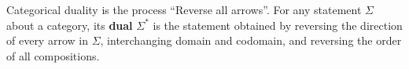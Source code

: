 Categorical duality is the process ``Reverse all arrows''.
For any statement $\Sigma$ about a category, its \textbf{dual} $\Sigma^{*}$ is the statement obtained by reversing the direction of every arrow in $\Sigma$, interchanging domain and codomain, and reversing the order of all compositions.
